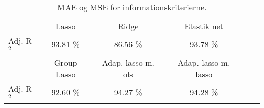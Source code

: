 \begin{table}
\center
\begin{tabular}{lccccc}
\toprule
& Lasso & Ridge & Elastik net \\
Adj. R$^2$ & 93.81 \%  & 86.56 \% & 93.78 \%  \\ \bottomrule \toprule 
& Group Lasso & Adap. lasso m. ols & Adap. lasso m. lasso  \\
Adj. R$^2$ & 92.60 \% & 94.27 \%  & 94.28 \% \\ \bottomrule 
 \end{tabular}
\caption{MAE og MSE for informationskriterierne.} \label{tab:factor_mse_tab}
\end{table}
